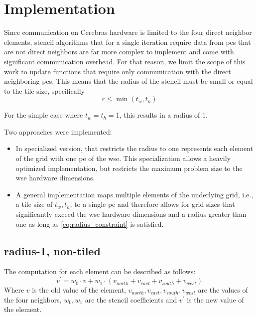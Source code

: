 \chapter{Implementation}
Since communication on Cerebras hardware is limited to the four direct neighbor elements, stencil algorithms that for a single iteration require data from \acp{pe} that are not direct neighbors are far more complex to implement and come with significant communication overhead. For that reason, we limit the scope of this work to update functions that require only communication with the direct neighboring \acp{pe}. This means that the radius of the stencil must be small or equal to the tile size, specifically
\begin{equation}    
\label{eq:radius_constraint}
r \leq \min(t_w, t_h)
\end{equation}

For the simple case where $t_w=t_h=1$, this results in a radius of 1.

Two approaches were implemented:
\begin{itemize}
    \item In specialized version, that restricts the radius to one represents each element of the grid with one \ac{pe} of the \ac{wse}. This specialization allows a heavily optimized implementation, but restricts the maximum problem size to the \ac{wse} hardware dimensions.
    \item A general implementation maps multiple elements of the underlying grid, i.e., a tile size of $t_w, t_h$, to a single \ac{pe} and therefore allows for grid sizes that significantly exceed the \ac{wse} hardware dimensions and a radius greater than one as long as \autoref{eq:radius_constraint} is satisfied. 
\end{itemize}

\section{radius-1, non-tiled}
The computation for each element can be described as follows:
\begin{equation}
    \label{eq:stencil_computation}
    v^{'} = w_0 \cdot v + w_1 \cdot (v_{north} + v_{east} + v_{south} + v_{west})
\end{equation}
Where $v$ is the old value of the element, $v_{north}, v_{east}, v_{south}, v_{west}$ are the values of the four neighbors, $w_0, w_1$ are the stencil coefficients and $v^'$ is the new value of the element.

